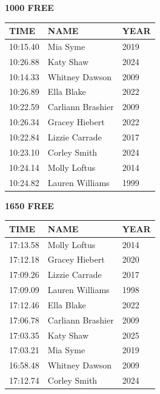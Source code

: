 \begin{table}[H]
\centering
\begin{minipage}[t]{0.48\textwidth}
\centering
\textbf{1000 FREE}\\[0.1cm]
\begin{tabular}{@{}p{1.8cm}p{2.8cm}p{1.2cm}@{}}
\hline
    \textbf{TIME} & \textbf{NAME} & \textbf{YEAR} \\
\hline
    10:15.40 & Mia Syme & 2019 \\
    10:26.88 & Katy Shaw & 2024 \\
    10:14.33 & Whitney Dawson & 2009 \\
    10:26.89 & Ella Blake & 2022 \\
    10:22.59 & Carliann Brashier & 2009 \\
    10:26.34 & Gracey Hiebert & 2022 \\
    10:22.84 & Lizzie Carrade & 2017 \\
    10:23.10 & Corley Smith & 2024 \\
    10:24.14 & Molly Loftus & 2014 \\
    10:24.82 & Lauren Williams & 1999 \\
\hline
\end{tabular}
\end{minipage}\hfill
\begin{minipage}[t]{0.48\textwidth}
\centering
\textbf{1650 FREE}\\[0.1cm]
\begin{tabular}{@{}p{1.8cm}p{2.8cm}p{1.2cm}@{}}
\hline
    \textbf{TIME} & \textbf{NAME} & \textbf{YEAR} \\
\hline
    17:13.58 & Molly Loftus & 2014 \\
    17:12.18 & Gracey Hiebert & 2020 \\
    17:09.26 & Lizzie Carrade & 2017 \\
    17:09.09 & Lauren Williams & 1998 \\
    17:12.46 & Ella Blake & 2022 \\
    17:06.78 & Carliann Brashier & 2009 \\
    17:03.35 & Katy Shaw & 2025 \\
    17:03.21 & Mia Syme & 2019 \\
    16:58.48 & Whitney Dawson & 2009 \\
    17:12.74 & Corley Smith & 2024 \\
\hline
\end{tabular}
\end{minipage}
\end{table}

